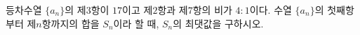 등차수열 $\{a_n\}$의 제$3$항이 $17$이고 제$2$항과 제$7$항의 비가 $4:1$이다. 수열 $\{a_n\}$의 첫째항부터 제$n$항까지의 합을 $S_n$이라 할 때, $S_n$의 최댓값을 구하시오.
